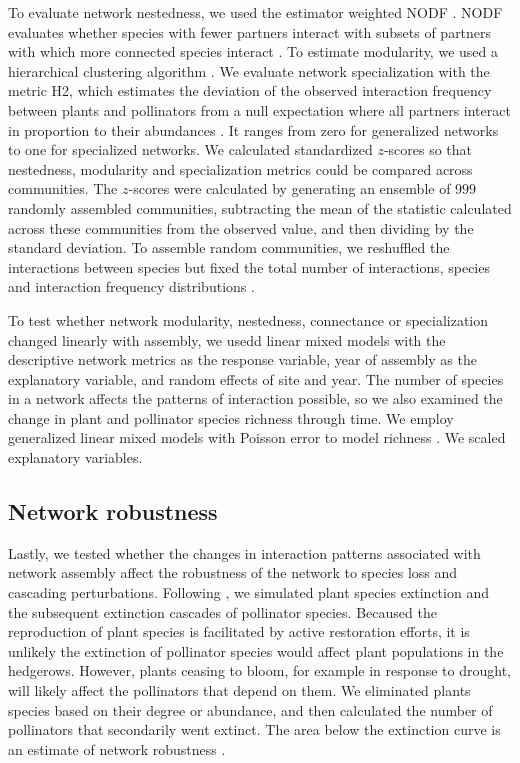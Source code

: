 \documentclass[12pt]{article}
\begin{document}
To evaluate network nestedness, we used the estimator weighted NODF
\citep{almeida-neto-2008-1227}. NODF evaluates whether species with
fewer partners interact with subsets of partners with which more
connected species interact \citep{almeida-neto-2008-1227}. To estimate
modularity, we used a hierarchical clustering algorithm
\citep{Newman2004, csardi-2006}. We evaluate network specialization with
the metric H2, which estimates the deviation of the observed
interaction frequency between plants and pollinators from a null
expectation where all partners interact in proportion to their
abundances \citep{bluthgen-2006-9}. It ranges from zero for
generalized networks to one for specialized networks.  We calculated
standardized $z$-scores so that nestedness, modularity and
specialization metrics could be compared across communities. The
$z$-scores were calculated by generating an ensemble of $999$ randomly
assembled communities, subtracting the mean of the statistic
calculated across these communities from the observed value, and then
dividing by the standard deviation. To assemble random communities, we
reshuffled the interactions between species but fixed the total number
of interactions, species and interaction frequency distributions
\citep{Galeano2009}.

To test whether network modularity, nestedness, connectance or
specialization changed linearly with assembly, we usedd linear mixed
models with the descriptive network metrics as the response variable,
year of assembly as the explanatory variable, and random effects of
site and year. The number of species in a network affects the patterns
of interaction possible, so we also examined the change in plant and
pollinator species richness through time. We employ generalized linear
mixed models with Poisson error to model richness \citep{lme4}. We
scaled explanatory variables.


\subsection*{Network robustness}
Lastly, we tested whether the changes in interaction patterns
associated with network assembly affect the robustness of the network
to species loss and cascading perturbations. Following
\cite{Memmott2004}, we simulated plant species extinction and the
subsequent extinction cascades of pollinator species. Becaused the
reproduction of plant species is facilitated by active restoration
efforts, it is unlikely the extinction of pollinator species would
affect plant populations in the hedgerows. However, plants ceasing to
bloom, for example in response to drought, will likely affect the
pollinators that depend on them. We eliminated plants species based on
their degree or abundance, and then calculated the number of
pollinators that secondarily went extinct. The area below the
extinction curve is an estimate of network robustness
\citep{Memmott2004, bipartite}.
\end{document}
